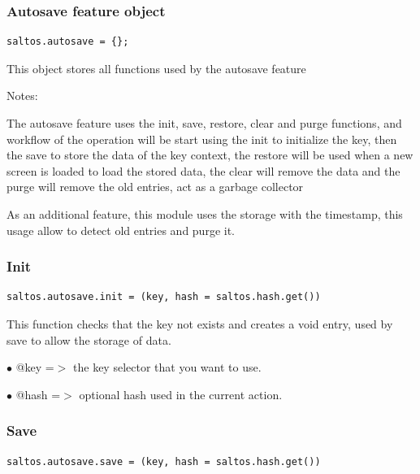 \documentclass[a4paper]{article}
\begin{document}
\hypertarget{toc35}{}
\subsubsection{Autosave feature object}

\begin{lstlisting}
saltos.autosave = {};
\end{lstlisting}

This object stores all functions used by the autosave feature

Notes:

The autosave feature uses the init, save, restore, clear and purge functions, and
workflow of the operation will be start using the init to initialize the key, then
the save to store the data of the key context, the restore will be used when a new
screen is loaded to load the stored data, the clear will remove the data and the
purge will remove the old entries, act as a garbage collector

As an additional feature, this module uses the storage with the timestamp, this
usage allow to detect old entries and purge it.

\hypertarget{toc36}{}
\subsubsection{Init}

\begin{lstlisting}
saltos.autosave.init = (key, hash = saltos.hash.get())
\end{lstlisting}

This function checks that the key not exists and creates a void entry, used by
save to allow the storage of data.

\begin{compactitem}
\item[\color{myblue}$\bullet$] @key  =$>$ the key selector that you want to use.
\item[\color{myblue}$\bullet$] @hash =$>$ optional hash used in the current action.
\end{compactitem}

\hypertarget{toc37}{}
\subsubsection{Save}

\begin{lstlisting}
saltos.autosave.save = (key, hash = saltos.hash.get())
\end{lstlisting}
\end{document}
